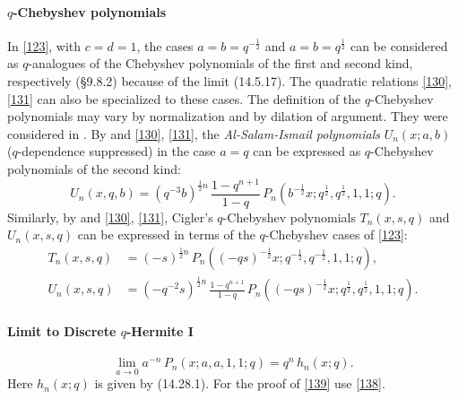 \documentclass[twoside,11pt]{article}
\newcommand\half{\frac12}
\begin{document}
\paragraph{$q$-Chebyshev polynomials}
In \eqref{123}, with $c=d=1$, the cases $a=b=q^{-\half}$ and $a=b=q^\half$ can be considered
as $q$-analogues of the Chebyshev polynomials of the first and second kind, respectively
(\S9.8.2) because of the limit (14.5.17). The quadratic relations \eqref{130}, \eqref{131}
can also be specialized to these cases. The definition of the $q$-Chebyshev polynomials
may vary by normalization and by dilation of argument. They were considered in
\cite{K18}. 
By  and \eqref{130}, \eqref{131}, the {\em Al-Salam-Ismail polynomials}
$U_n(x;a,b)$ ($q$-dependence suppressed) in the case $a=q$ can be expressed as
$q$-Chebyshev polynomials of the second kind:
\begin{equation*}
U_n(x,q,b)=(q^{-3} b)^{\half n}\,\frac{1-q^{n+1}}{1-q}\,
P_n(b^{-\half}x;q^\half,q^\half,1,1;q).
\end{equation*}
Similarly, by \cite[(5.4), (5.1), (5.3)]{K19} and \eqref{130}, \eqref{131}, Cigler's $q$-Chebyshev
polynomials $T_n(x,s,q)$ and $U_n(x,s,q)$
can be expressed in terms of the $q$-Chebyshev cases of \eqref{123}:
\begin{align*}
T_n(x,s,q)&=(-s)^{\half n}\,P_n((-qs)^{-\half} x;q^{-\half},q^{-\half},1,1;q),\\
U_n(x,s,q)&=(-q^{-2}s)^{\half n}\,\frac{1-q^{n+1}}{1-q}\,
P_n((-qs)^{-\half} x;q^{\half},q^{\half},1,1;q).
\end{align*}
%
\paragraph{Limit to Discrete $q$-Hermite I}
\begin{equation}
\lim_{a\to0} a^{-n}\,P_n(x;a,a,1,1;q)=q^n\,h_n(x;q).
\label{139}
\end{equation}
Here $h_n(x;q)$ is given by (14.28.1).
For the proof of \eqref{139} use \eqref{138}.
%
\end{document}

